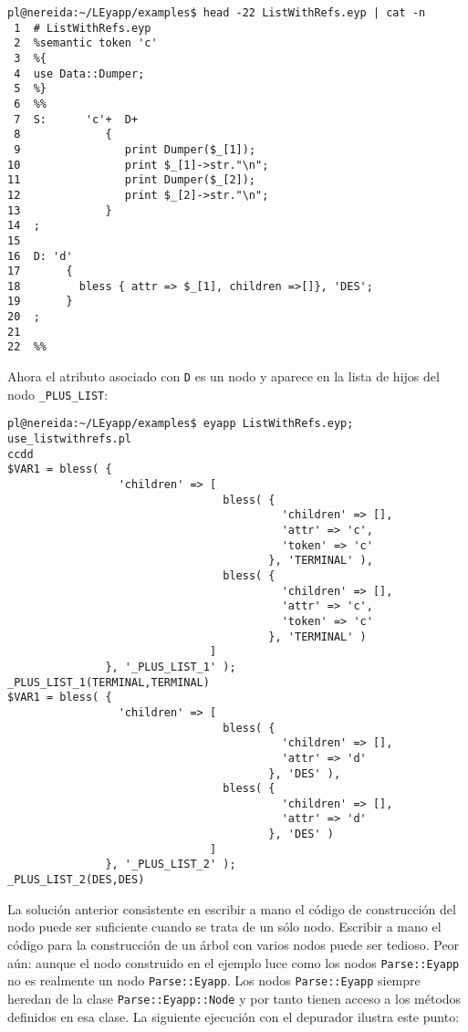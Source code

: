 \begin{verbatim}
pl@nereida:~/LEyapp/examples$ head -22 ListWithRefs.eyp | cat -n
 1  # ListWithRefs.eyp
 2  %semantic token 'c'
 3  %{
 4  use Data::Dumper;
 5  %}
 6  %%
 7  S:      'c'+  D+
 8             {
 9                print Dumper($_[1]);
10                print $_[1]->str."\n";
11                print Dumper($_[2]);
12                print $_[2]->str."\n";
13             }
14  ;
15
16  D: 'd'
17       {
18         bless { attr => $_[1], children =>[]}, 'DES';
19       }
20  ;
21
22  %%
\end{verbatim}

Ahora el atributo asociado con \verb|D| es un nodo y aparece en la 
lista de hijos del nodo \verb|_PLUS_LIST|:

\begin{verbatim}
pl@nereida:~/LEyapp/examples$ eyapp ListWithRefs.eyp; use_listwithrefs.pl
ccdd
$VAR1 = bless( {
                 'children' => [
                                 bless( {
                                          'children' => [],
                                          'attr' => 'c',
                                          'token' => 'c'
                                        }, 'TERMINAL' ),
                                 bless( {
                                          'children' => [],
                                          'attr' => 'c',
                                          'token' => 'c'
                                        }, 'TERMINAL' )
                               ]
               }, '_PLUS_LIST_1' );
_PLUS_LIST_1(TERMINAL,TERMINAL)
$VAR1 = bless( {
                 'children' => [
                                 bless( {
                                          'children' => [],
                                          'attr' => 'd'
                                        }, 'DES' ),
                                 bless( {
                                          'children' => [],
                                          'attr' => 'd'
                                        }, 'DES' )
                               ]
               }, '_PLUS_LIST_2' );
_PLUS_LIST_2(DES,DES)
\end{verbatim}


La solución anterior consistente en escribir a mano el código de construcción del nodo
puede ser suficiente cuando se trata de un sólo nodo.
Escribir a mano el código para la construcción de un árbol con varios nodos
puede ser tedioso. Peor aún: aunque el nodo construido en el ejemplo
luce como los nodos \verb|Parse::Eyapp| no es realmente un nodo 
\verb|Parse::Eyapp|. Los nodos \verb|Parse::Eyapp| siempre heredan
de la clase \verb|Parse::Eyapp::Node| y por tanto tienen
acceso a los métodos definidos en esa clase. 
La siguiente ejecución con el depurador ilustra este punto:

